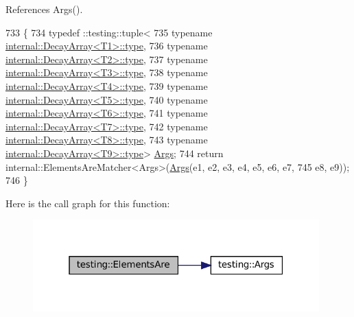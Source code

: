 References Args().


\begin{DoxyCode}
733                                                                           \{
734   typedef ::testing::tuple<
735       \textcolor{keyword}{typename} \hyperlink{namespacegenerate__debs_a50bc9a7ecac9584553e089a448bcde58}{internal::DecayArray<T1>::type},
736       \textcolor{keyword}{typename} \hyperlink{namespacegenerate__debs_a50bc9a7ecac9584553e089a448bcde58}{internal::DecayArray<T2>::type},
737       \textcolor{keyword}{typename} \hyperlink{namespacegenerate__debs_a50bc9a7ecac9584553e089a448bcde58}{internal::DecayArray<T3>::type},
738       \textcolor{keyword}{typename} \hyperlink{namespacegenerate__debs_a50bc9a7ecac9584553e089a448bcde58}{internal::DecayArray<T4>::type},
739       \textcolor{keyword}{typename} \hyperlink{namespacegenerate__debs_a50bc9a7ecac9584553e089a448bcde58}{internal::DecayArray<T5>::type},
740       \textcolor{keyword}{typename} \hyperlink{namespacegenerate__debs_a50bc9a7ecac9584553e089a448bcde58}{internal::DecayArray<T6>::type},
741       \textcolor{keyword}{typename} \hyperlink{namespacegenerate__debs_a50bc9a7ecac9584553e089a448bcde58}{internal::DecayArray<T7>::type},
742       \textcolor{keyword}{typename} \hyperlink{namespacegenerate__debs_a50bc9a7ecac9584553e089a448bcde58}{internal::DecayArray<T8>::type},
743       \textcolor{keyword}{typename} \hyperlink{namespacegenerate__debs_a50bc9a7ecac9584553e089a448bcde58}{internal::DecayArray<T9>::type}> 
      \hyperlink{namespacetesting_a09ac462e8d6ed468cbfaa9c767aee0aa}{Args};
744   \textcolor{keywordflow}{return} internal::ElementsAreMatcher<Args>(\hyperlink{namespacetesting_a09ac462e8d6ed468cbfaa9c767aee0aa}{Args}(e1, e2, e3, e4, e5, e6, e7,
745       e8, e9));
746 \}
\end{DoxyCode}
Here is the call graph for this function\+:
\nopagebreak
\begin{figure}[H]
\begin{center}
\leavevmode
\includegraphics[width=313pt]{namespacetesting_aa39ad709c933dbbbe3cbaececa8b4577_cgraph}
\end{center}
\end{figure}
\mbox{\label{namespacetesting_a047f5f5a28c156a70002668323009ae9}} 
